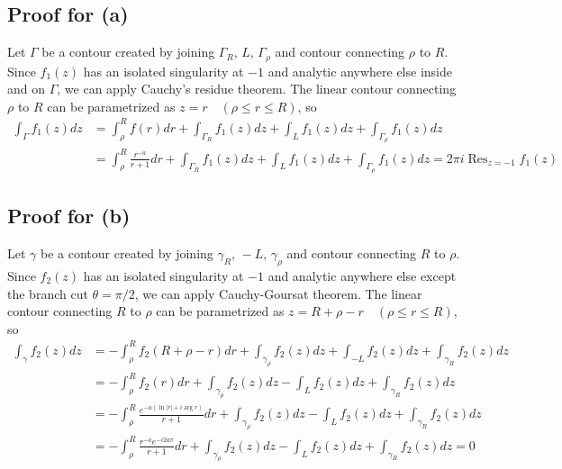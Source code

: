 \documentclass{scrartcl}
\DeclareMathOperator*{\Res}{Res}
\begin{document}
\subsection{Proof for (a)}
Let \(\Gamma\) be a contour created by joining \(\Gamma_R,\, L,\, \Gamma_\rho\) and contour connecting \(\rho\) to \(R\).
Since \(f_1(z)\) has an isolated singularity at \(-1\) and analytic anywhere else inside and on \(\Gamma\), we can apply Cauchy's residue theorem.
The linear contour connecting \(\rho\) to \(R\) can be parametrized as \(z = r \quad (\rho \leq r \leq R)\), so
\begin{align}
  \nonumber \int_\Gamma f_1(z) dz
  &= \int^R_\rho f(r) dr + \int_{\Gamma_R} f_1(z) dz + \int_L f_1(z) dz + \int_{\Gamma_\rho} f_1(z) dz \\
  \label{sec6_1_int} &= \int^R_\rho \frac{r^{-a}}{r + 1} dr + \int_{\Gamma_R} f_1(z) dz + \int_L f_1(z) dz + \int_{\Gamma_\rho} f_1(z) dz
  = 2\pi i \Res_{z = -1} f_1(z)
\end{align}

\subsection{Proof for (b)}
Let \(\gamma\) be a contour created by joining \(\gamma_R,\, -L,\, \gamma_\rho\) and contour connecting \(R\) to \(\rho\).
Since \(f_2(z)\) has an isolated singularity at \(-1\) and analytic anywhere else except the branch cut \(\theta = \pi / 2\), we can apply Cauchy-Goursat theorem.
The linear contour connecting \(R\) to \(\rho\) can be parametrized as \(z = R + \rho - r \quad (\rho \leq r \leq R)\), so
\begin{align}
  \nonumber \int_\gamma f_2(z) dz
  &= -\int^R_\rho f_2(R + \rho - r) dr + \int_{\gamma_\rho} f_2(z) dz + \int_{-L} f_2(z) dz + \int_{\gamma_R} f_2(z) dz \\
  \nonumber &= -\int^R_\rho f_2(r) dr + \int_{\gamma_\rho} f_2(z) dz - \int_L f_2(z) dz + \int_{\gamma_R} f_2(z) dz \\
  \nonumber &= -\int^R_\rho \frac{e^{-a(\ln |r| + i\arg r)}}{r + 1} dr + \int_{\gamma_\rho} f_2(z) dz - \int_L f_2(z) dz + \int_{\gamma_R} f_2(z) dz \\
  \label{sec6_2_int} &= -\int^R_\rho \frac{r^{-a} e^{-i2a\pi}}{r + 1} dr + \int_{\gamma_\rho} f_2(z) dz - \int_L f_2(z) dz + \int_{\gamma_R} f_2(z) dz
  = 0
\end{align}
\end{document}
